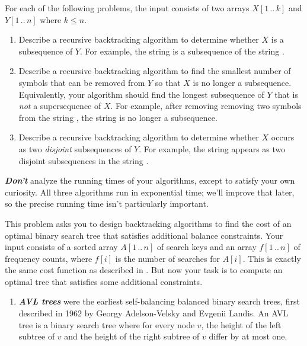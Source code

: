 \begin{exercises}
\item For each of the following problems, the input consists of two arrays $X[1\,..\,k]$ and $Y[1\,..\,n]$ where $k \le n$.
\begin{enumerate}
\item Describe a recursive backtracking algorithm to determine whether $X$ is a subsequence of $Y$.
For example, the string  is a subsequence of the string .
\item Describe a recursive backtracking algorithm to find the smallest number of symbols that can be removed from $Y$ so that $X$ is no longer a subsequence.
Equivalently, your algorithm should find the longest subsequence of $Y$ that is \textit{not} a supersequence of $X$.
For example, after removing removing two symbols from the string , the string  is no longer a subsequence.
\item {} Describe a recursive backtracking algorithm to determine whether $X$ occurs as two \textit{disjoint} subsequences of $Y$.
For example, the string  appears as two disjoint subsequences in the string .
\end{enumerate}
\textbf{\textit{Don’t}} analyze the running times of your algorithms, except to satisfy your own curiosity.
All three algorithms run in exponential time; we’ll improve that later, so the precise running time isn’t particularly important.

\item This problem asks you to design backtracking algorithms to find the cost of an optimal binary search tree that satisfies additional balance constraints.
Your input consists of a sorted array $A[1\,..\,n]$ of search keys and an array $f[1\,..\,n]$ of frequency counts, where $f[i]$ is the number of searches for $A[i]$.
This is exactly the same cost function as described in .
But now your task is to compute an optimal tree that satisfies some additional constraints.
\begin{enumerate}
\item \textbf{\textit{AVL trees}} were the earliest self-balancing balanced binary search trees, first described in 1962 by Georgy Adelson-Velsky and Evgenii Landis.
An AVL tree is a binary search tree where for every node $v$, the height of the left subtree of $v$ and the height of the right subtree of $v$ differ by at most one.


\end{enumerate}
\end{exercises}
